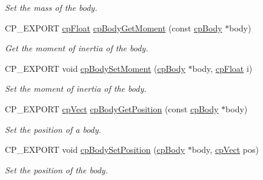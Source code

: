 \begin{DoxyCompactItemize}
\begin{DoxyCompactList}\small\item\em Set the mass of the body. \end{DoxyCompactList}\item 
\mbox{\label{group__cp_body_gada72b5ece7fe990a15516ab1d2a59fd2}} 
C\+P\+\_\+\+E\+X\+P\+O\+RT \mbox{\hyperlink{group__basic_types_gac1ed65573e035bf892505768c852d8d3}{cp\+Float}} \mbox{\hyperlink{group__cp_body_gada72b5ece7fe990a15516ab1d2a59fd2}{cp\+Body\+Get\+Moment}} (const \mbox{\hyperlink{structcp_body}{cp\+Body}} $\ast$body)
\begin{DoxyCompactList}\small\item\em Get the moment of inertia of the body. \end{DoxyCompactList}\item 
\mbox{\label{group__cp_body_gab50551755486b071328e4a44a989cced}} 
C\+P\+\_\+\+E\+X\+P\+O\+RT void \mbox{\hyperlink{group__cp_body_gab50551755486b071328e4a44a989cced}{cp\+Body\+Set\+Moment}} (\mbox{\hyperlink{structcp_body}{cp\+Body}} $\ast$body, \mbox{\hyperlink{group__basic_types_gac1ed65573e035bf892505768c852d8d3}{cp\+Float}} i)
\begin{DoxyCompactList}\small\item\em Set the moment of inertia of the body. \end{DoxyCompactList}\item 
\mbox{\label{group__cp_body_gaf339449a9bbdd7341e4567a58e021523}} 
C\+P\+\_\+\+E\+X\+P\+O\+RT \mbox{\hyperlink{structcp_vect}{cp\+Vect}} \mbox{\hyperlink{group__cp_body_gaf339449a9bbdd7341e4567a58e021523}{cp\+Body\+Get\+Position}} (const \mbox{\hyperlink{structcp_body}{cp\+Body}} $\ast$body)
\begin{DoxyCompactList}\small\item\em Set the position of a body. \end{DoxyCompactList}\item 
\mbox{\label{group__cp_body_ga959d9f215f1102cfc0ad6e9271c64ba4}} 
C\+P\+\_\+\+E\+X\+P\+O\+RT void \mbox{\hyperlink{group__cp_body_ga959d9f215f1102cfc0ad6e9271c64ba4}{cp\+Body\+Set\+Position}} (\mbox{\hyperlink{structcp_body}{cp\+Body}} $\ast$body, \mbox{\hyperlink{structcp_vect}{cp\+Vect}} pos)
\begin{DoxyCompactList}\small\item\em Set the position of the body. \end{DoxyCompactList}\item 

\end{DoxyCompactItemize}
